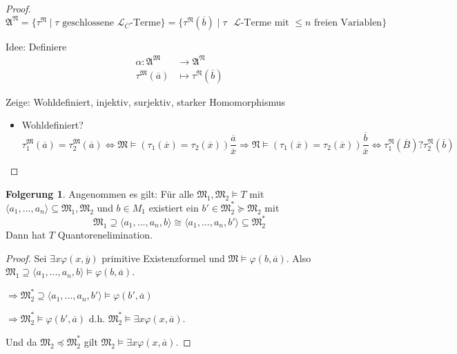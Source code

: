 \documentclass[12pt,parskip=full]{scrartcl}
\theoremstyle{definition}
\newtheorem{corollary}[theorem]{Folgerung}
\begin{document}
\begin{proof}
		\begin{equation*}
			\mathfrak{A}^\mathfrak{N} = \{ \tau^\mathfrak{N} \mid \text{$\tau$ geschlossene $\mathcal{L}_{\overline{C}}$-Terme} \} = \{ \tau^\mathfrak{N}(\overline{b}) \mid \text{$\tau$ $\mathcal{L}$-Terme mit $\leq n$ freien Variablen} \}
		\end{equation*}
		
		Idee: Definiere
		\begin{align*}
			\alpha: \mathfrak{A}^\mathfrak{M} &\to \mathfrak{A}^\mathfrak{N} \\
			\tau^\mathfrak{M}(\overline{a}) &\mapsto \tau^\mathfrak{N}(\overline{b})
		\end{align*}
		
		Zeige: Wohldefiniert, injektiv, surjektiv, starker Homomorphismus
		\begin{itemize}
			\item Wohldefiniert?
			\begin{equation*}
				\tau_1^\mathfrak{M}(\overline{a}) = \tau_2^\mathfrak{M}(\overline{a}) \Leftrightarrow \mathfrak{M} \models (\tau_1(\overline{x}) = \tau_2(\overline{x}))\frac{\overline{a}}{\overline{x}} \Rightarrow \mathfrak{N} \models (\tau_1(\overline{x}) = \tau_2(\overline{x}))\frac{\overline{b}}{\overline{x}} \Leftrightarrow \tau_1^\mathfrak{N}(\overline{B}) ? \tau_2^\mathfrak{N}(\overline{b})
			\end{equation*}
		\end{itemize}
	\end{proof}

	\begin{corollary}
		Angenommen es gilt: Für alle $\mathfrak{M}_1, \mathfrak{M}_2 \models T$ mit $\langle a_1, \dots, a_n \rangle \subseteq \mathfrak{M}_1, \mathfrak{M}_2$ und $b \in M_1$ existiert ein $b' \in \mathfrak{M}_2^* \succcurlyeq \mathfrak{M}_2$ mit
		\begin{equation*}
			\mathfrak{M}_1 \supseteq \langle a_1, \dots, a_n, b \rangle \cong \langle a_1, \dots, a_n, b' \rangle \subseteq \mathfrak{M}_2^*
		\end{equation*}
		Dann hat $T$ Quantorenelimination.
	\end{corollary}

	\begin{proof}
		Sei $\exists x \varphi(x,\overline{y})$ primitive Existenzformel und $\mathfrak{M} \models \varphi(b, \overline{a})$. Also $\mathfrak{M}_1 \supseteq \langle a_1, \dots, a_n, b \rangle \models \varphi(b, \overline{a})$.
		
		$\Rightarrow \mathfrak{M}_2^* \supseteq \langle a_1, \dots, a_n, b' \rangle \models \varphi(b', \overline{a})$
		
		$\Rightarrow \mathfrak{M}_2^* \models \varphi(b', \overline{a})$ d.h. $\mathfrak{M}_2^* \models \exists x \varphi(x, \overline{a})$.
		
		Und da $\mathfrak{M}_2 \preccurlyeq \mathfrak{M}_2^*$ gilt $\mathfrak{M}_2 \models \exists x \varphi(x, \overline{a})$.
	\end{proof}
\end{document}
